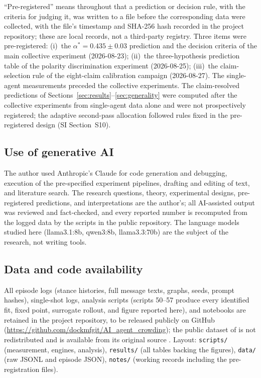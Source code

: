 \documentclass[11pt]{article}
\newcommand{\astar}{\alpha^{*}}
\begin{document}
``Pre-registered'' means throughout that a prediction or decision rule, with
the criteria for judging it, was written to a file before the corresponding
data were collected, with the file's timestamp and SHA-256 hash recorded in
the project repository; these are local records, not a third-party registry.
Three items were pre-registered: (i)~the $\astar = 0.435 \pm 0.03$ prediction
and the decision criteria of the main collective experiment (2026-08-23);
(ii)~the three-hypothesis prediction table of the polarity discrimination
experiment (2026-08-25); (iii)~the claim-selection rule of the eight-claim
calibration campaign (2026-08-27). The single-agent measurements preceded
the collective experiments. The claim-resolved predictions of
Sections~\ref{sec:results}--\ref{sec:generality} were computed after the
collective experiments from single-agent data alone and were not
prospectively registered; the adaptive second-pass allocation followed rules
fixed in the pre-registered design (SI Section~S10).

\subsection*{Use of generative AI}

The author used Anthropic's Claude for code generation and debugging,
execution of the pre-specified experiment pipelines, drafting and editing of
text, and literature search. The research questions, theory, experimental
designs, pre-registered predictions, and interpretations are the author's;
all AI-assisted output was reviewed and fact-checked, and every reported
number is recomputed from the logged data by the scripts in the public
repository. The language models studied here (llama3.1:8b, qwen3:8b,
llama3.3:70b) are the subject of the research, not writing tools.

\subsection*{Data and code availability}

All episode logs (stance histories, full message texts, graphs, seeds, prompt
hashes), single-shot logs, analysis scripts (scripts 50--57 produce every
identified fit, fixed point, surrogate rollout, and figure reported here), and
notebooks are retained in the project repository, to be released publicly on GitHub
(\url{https://github.com/dockmfgit/AI_agent_crowding}); the public
dataset of \citet{El2026} is not redistributed and is available from its
original source \citep{El2026data}. Layout: \texttt{scripts/} (measurement, engines, analysis),
\texttt{results/} (all tables backing the figures), \texttt{data/}
(raw JSONL and episode JSON), \texttt{notes/} (working records including the
pre-registration files).



\end{document}
